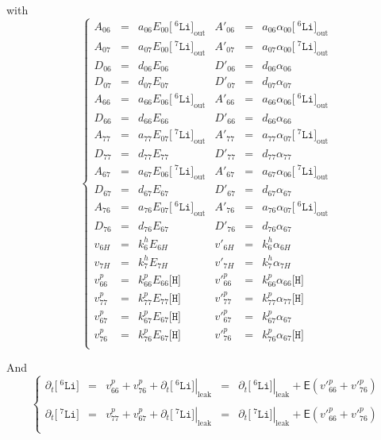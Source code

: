\documentclass[aps,onecolumn,11pt]{revtex4}
\newcommand{\mychem}[1]{\mathtt{#1}}
\newcommand{\myconc}[1]{\big[#1\big]}
\newcommand{\spLi}[1]{{\!~^{#1}\mychem{Li}}}
\newcommand{\Li}[1]{\myconc{\spLi{#1}}}
\newcommand{\spproton}{\mychem{H}}
\newcommand{\proton}{\myconc{\spproton}}
\newcommand{\myleak}[1]{\left.{#1}\right\vert_{\mathrm{leak}}}
\newcommand{\myout}[1]{{#1}_{\mathrm{out}}}
\newcommand{\LiOut}[1]{\myout{\Li{#1}}}
\begin{document}
with
\begin{equation}
\left\lbrace
\begin{array}{rcl|rcl}
A_{06}   & = & a_{06} E_{00} \LiOut{6}  & A'_{06}   & = & a_{06}    \alpha_{00} \LiOut{6}\\
A_{07}   & = & a_{07} E_{00} \LiOut{7}  & A'_{07}   & = & a_{07}    \alpha_{00} \LiOut{7}\\
D_{06}   & = & d_{06} E_{06}            & D'_{06}   & = & d_{06}    \alpha_{06}\\
D_{07}   & = & d_{07} E_{07}            & D'_{07}   & = & d_{07}    \alpha_{07}\\
A_{66}   & = & a_{66} E_{06} \LiOut{6}  & A'_{66}   & = & a_{66}    \alpha_{06} \LiOut{6} \\
D_{66}   & = & d_{66} E_{66}            & D'_{66}   & = & d_{66}    \alpha_{66}\\
A_{77}   & = & a_{77} E_{07} \LiOut{7}  & A'_{77}   & = & a_{77}    \alpha_{07} \LiOut{7}\\
D_{77}   & = & d_{77} E_{77}            & D'_{77}   & = & d_{77}    \alpha_{77}\\
A_{67}   & = & a_{67} E_{06} \LiOut{7}  & A'_{67}   & = & a_{67}    \alpha_{06} \LiOut{7}\\
D_{67}   & = & d_{67} E_{67}            & D'_{67}   & = & d_{67}    \alpha_{67}\\
A_{76}   & = & a_{76} E_{07} \LiOut{6}  & A'_{76}   & = & a_{76}    \alpha_{07} \LiOut{6}\\
D_{76}   & = & d_{76} E_{67}            & D'_{76}   & = & d_{76}    \alpha_{67}\\
v_{6H}   & = & k^h_6 E_{6H}             & v'_{6H}   & = & k^h_6    \alpha_{6H} \\
v_{7H}   & = & k^h_7 E_{7H}             & v'_{7H}   & = & k^h_7    \alpha_{7H} \\
v^p_{66} & = & k^p_{66} E_{66} \proton  & v'^p_{66} & = & k^p_{66} \alpha_{66} \proton\\
v^p_{77} & = & k^p_{77} E_{77} \proton  & v'^p_{77} & = & k^p_{77} \alpha_{77} \proton\\
v^p_{67} & = & k^p_{67} E_{67} \proton  & v'^p_{67} & = & k^p_{67} \alpha_{67}\\
v^p_{76} & = & k^p_{76} E_{67} \proton  & v'^p_{76} & = & k^p_{76} \alpha_{67} \proton\\
\end{array}
\right.
\end{equation}

And
\begin{equation}
\left\lbrace
\begin{array}{rclcl}
	\partial_t \Li{6} & = & v^p_{66}+v^p_{76} + \partial_t \myleak{\Li{6}} & = & \partial_t \myleak{\Li{6}} + \mathsf{E} \left( v'^p_{66}+v'^p_{76}\right) \\
	\\
	\partial_t \Li{7} & = & v^p_{77}+v^p_{67} + \partial_t \myleak{\Li{7}} & = & \partial_t \myleak{\Li{7}} + \mathsf{E} \left( v'^p_{66}+v'^p_{76}\right)\\
\end{array}
\right.
\end{equation}
\end{document}
